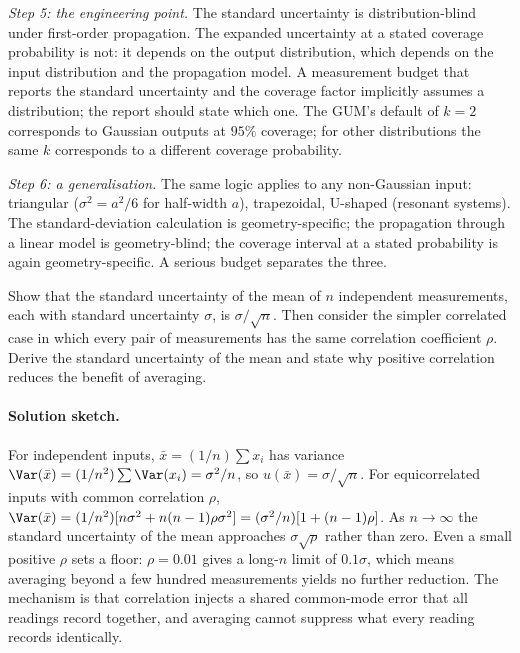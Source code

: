 \emph{Step 5: the engineering point.} The standard uncertainty is
distribution-blind under first-order propagation. The expanded
uncertainty at a stated coverage probability is not: it depends on
the output distribution, which depends on the input distribution
and the propagation model. A measurement budget that reports the
standard uncertainty and the coverage factor implicitly assumes a
distribution; the report should state which one. The GUM's default
of $k = 2$ corresponds to Gaussian outputs at $95\%$ coverage; for
other distributions the same $k$ corresponds to a different
coverage probability.

\emph{Step 6: a generalisation.} The same logic applies to any
non-Gaussian input: triangular ($\sigma^{2} = a^{2}/6$ for
half-width $a$), trapezoidal, U-shaped (resonant systems). The
standard-deviation calculation is geometry-specific; the
propagation through a linear model is geometry-blind; the
coverage interval at a stated probability is again
geometry-specific. A serious budget separates the three.

\begin{exercise}
Show that the standard uncertainty of the mean of $n$ independent
measurements, each with standard uncertainty $\sigma$, is
$\sigma / \sqrt{n}$. Then consider the simpler correlated case in
which every pair of measurements has the same correlation
coefficient $\rho$. Derive the standard uncertainty of the mean and
state why positive correlation reduces the benefit of averaging.
\end{exercise}

\paragraph{Solution sketch.}
For independent inputs, $\bar{x} = (1/n)\sum x_{i}$ has variance
$\Var(\bar{x}) = (1/n^{2})\sum \Var(x_{i}) = \sigma^{2}/n$, so
$u(\bar{x}) = \sigma/\sqrt{n}$. For equicorrelated inputs with
common correlation $\rho$, $\Var(\bar{x}) = (1/n^{2})[n\sigma^{2}
+ n(n-1)\rho\sigma^{2}] = (\sigma^{2}/n)[1 + (n-1)\rho]$. As
$n \to \infty$ the standard uncertainty of the mean approaches
$\sigma\sqrt{\rho}$ rather than zero. Even a small positive $\rho$
sets a floor: $\rho = 0.01$ gives a long-$n$ limit of
$0.1\sigma$, which means averaging beyond a few hundred
measurements yields no further reduction. The mechanism is that
correlation injects a shared common-mode error that all readings
record together, and averaging cannot suppress what every reading
records identically.

